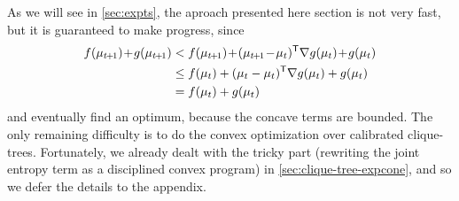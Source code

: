 As we will see in \cref{sec:expts}, the aproach presented here section is 
not very fast, but it is guaranteed to make progress, since
\def\tplus1{{t\mskip-2mu+\mskip-2mu1}}
\begin{align*}
    f(\mu_\tplus1) \!+\! g(\mu_\tplus1) &<  f(\mu_\tplus1) \!+\! (\mu_\tplus1 \!-\! \mu_t)^{\sf T} \nabla g(\mu_t) \!+\! g(\mu_t)
        \\
    &\le  f(\mu_t) + (\mu_t - \mu_{t})^{\sf T}\nabla g(\mu_t)  + g(\mu_t)
        \\
    &= f(\mu_t) + g(\mu_t)
\end{align*}
and eventually find an optimum, because the concave terms are bounded.
%
%
The only remaining difficulty is to do the convex optimization over
calibrated clique-trees. Fortunately, we already dealt with the 
tricky part (rewriting the joint entropy term as a disciplined convex program) in 
\cref{sec:clique-tree-expcone},
and so we defer the details to the appendix.
    
